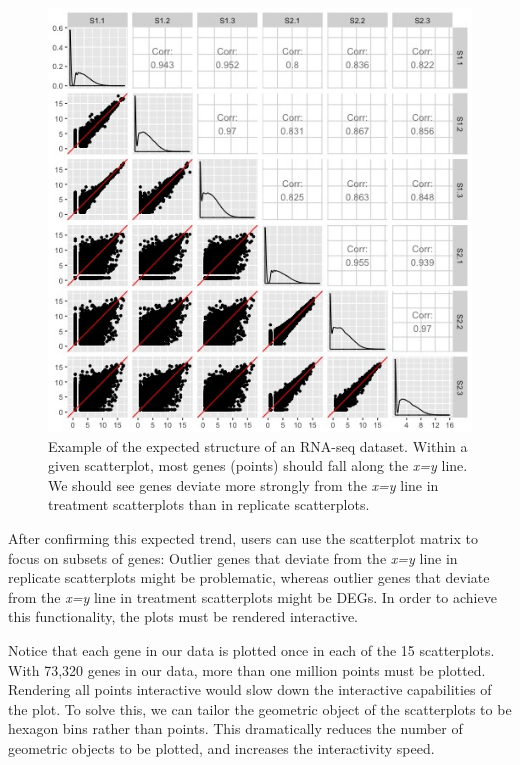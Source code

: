 \documentclass{bioinfo}
\begin{document}
\begin{figure}[!tpb]
\centerline{\includegraphics[width=\columnwidth]{../Bioinformatics/Pictures/SwitchSample/Switch12/NotSwitch/S1_S2_points_size1.jpg}}
\caption{Example of the expected structure of an RNA-seq dataset. Within a given scatterplot, most genes (points) should fall along the \textit{x=y} line. We should see genes deviate more strongly from the \textit{x=y} line in treatment scatterplots than in replicate scatterplots. 
\label{cotyIdeal}}
\end{figure}

After confirming this expected trend, users can use the scatterplot matrix to focus on subsets of genes: Outlier genes that deviate from the \textit{x=y} line in replicate scatterplots might be problematic, whereas outlier genes that deviate from the \textit{x=y} line in treatment scatterplots might be DEGs. In order to achieve this functionality, the plots must be rendered interactive.

Notice that each gene in our data is plotted once in each of the 15 scatterplots. With 73,320 genes in our data, more than one million points must be plotted. Rendering all points interactive would slow down the interactive capabilities of the plot. To solve this, we can tailor the geometric object of the scatterplots to be hexagon bins rather than points. This dramatically reduces the number of geometric objects to be plotted, and increases the interactivity speed.
\end{document}
